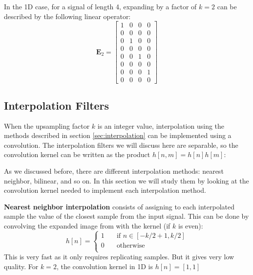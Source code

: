 In the 1D case, for a signal of length 4, expanding by a factor of $k=2$ can be described by the following linear operator:
\begin{equation}
\mathbf{E}_2 = \left[ 
\begin{array}{cccc}
1 & 0 & 0 & 0 \\
0 & 0 & 0 & 0\\
0 & 1 & 0 & 0\\ 
0 & 0 & 0 & 0\\
0 & 0 & 1 & 0\\ 
0 & 0 & 0 & 0\\
0 & 0 & 0 & 1\\
0 & 0 & 0 & 0
\end{array}
\right]
\end{equation}



\subsection{Interpolation Filters}

When the upsampling factor $k$ is an integer value, interpolation using the methods described in section \ref{sec:interpolation} can be implemented using a convolution. 
The interpolation filters we will discuss here are separable, so the convolution kernel can be written as the product $h\left[n,m\right] = h\left[n\right] h\left[m\right]$:

As we discussed before, there are different interpolation methods: nearest neighbor, bilinear, and so on. In this section we will study them by looking at the convolution kernel needed to implement each interpolation method. 

{\bf Nearest neighbor interpolation} consists of assigning to each interpolated sample the value of the closest sample from the input signal. This can be done by convolving the expanded image from \eqn{\ref{eq:upzeros}} with the kernel (if $k$ is even):
\begin{equation}
h  \left[n\right] =  \begin{cases}
    1     & \quad \text{if }  n \in  \left[-k/2+1, k/2\right] \\
    0       & \quad \text{otherwise }\\
\end{cases}
\end{equation}
This is very fast as it only requires replicating samples. But it gives very low quality. For $k=2$, the convolution kernel in 1D is $h  \left[n\right]=[1, 1]$

